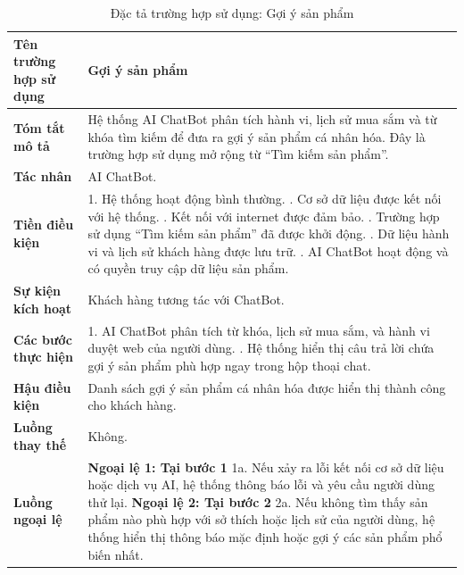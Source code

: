 \begin{longtable}{|>{\bfseries}p{4cm}|p{11.5cm}|}
\caption{Đặc tả trường hợp sử dụng: Gợi ý sản phẩm}
\label{tab:uc-product-suggestion} \\
\hline
\textbf{Tên trường hợp sử dụng} & Gợi ý sản phẩm \\
\hline
\textbf{Tóm tắt mô tả} & Hệ thống AI ChatBot phân tích hành vi, lịch sử mua sắm và từ khóa tìm kiếm để đưa ra gợi ý sản phẩm cá nhân hóa. Đây là trường hợp sử dụng mở rộng từ “Tìm kiếm sản phẩm”. \\
\hline
\textbf{Tác nhân} & AI ChatBot. \\
\hline
\textbf{Tiền điều kiện} & 1. Hệ thống hoạt động bình thường. \newline
2. Cơ sở dữ liệu được kết nối với hệ thống. \newline
3. Kết nối với internet được đảm bảo. \newline
4. Trường hợp sử dụng “Tìm kiếm sản phẩm” đã được khởi động. \newline
5. Dữ liệu hành vi và lịch sử khách hàng được lưu trữ. \newline
6. AI ChatBot hoạt động và có quyền truy cập dữ liệu sản phẩm. \\
\hline
\textbf{Sự kiện kích hoạt} & Khách hàng tương tác với ChatBot. \\
\hline
\textbf{Các bước thực hiện} & 1. AI ChatBot phân tích từ khóa, lịch sử mua sắm, và hành vi duyệt web của người dùng. \newline
2. Hệ thống hiển thị câu trả lời chứa gợi ý sản phẩm phù hợp ngay trong hộp thoại chat. \\
\hline
\textbf{Hậu điều kiện} & Danh sách gợi ý sản phẩm cá nhân hóa được hiển thị thành công cho khách hàng. \\
\hline
\textbf{Luồng thay thế} & Không. \\
\hline
\textbf{Luồng ngoại lệ} & \textbf{Ngoại lệ 1: Tại bước 1} \newline
1a. Nếu xảy ra lỗi kết nối cơ sở dữ liệu hoặc dịch vụ AI, hệ thống thông báo lỗi và yêu cầu người dùng thử lại. \newline
\textbf{Ngoại lệ 2: Tại bước 2} \newline
2a. Nếu không tìm thấy sản phẩm nào phù hợp với sở thích hoặc lịch sử của người dùng, hệ thống hiển thị thông báo mặc định hoặc gợi ý các sản phẩm phổ biến nhất. \\
\hline
\end{longtable}


